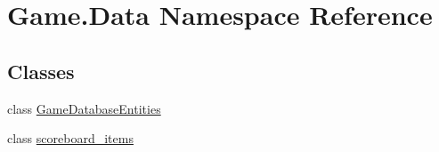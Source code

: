 \hypertarget{namespace_game_1_1_data}{}\section{Game.\+Data Namespace Reference}
\label{namespace_game_1_1_data}
\subsection*{Classes}
\begin{DoxyCompactItemize}
\item 
class \mbox{\hyperlink{class_game_1_1_data_1_1_game_database_entities}{Game\+Database\+Entities}}
\item 
class \mbox{\hyperlink{class_game_1_1_data_1_1scoreboard__items}{scoreboard\+\_\+items}}
\end{DoxyCompactItemize}

